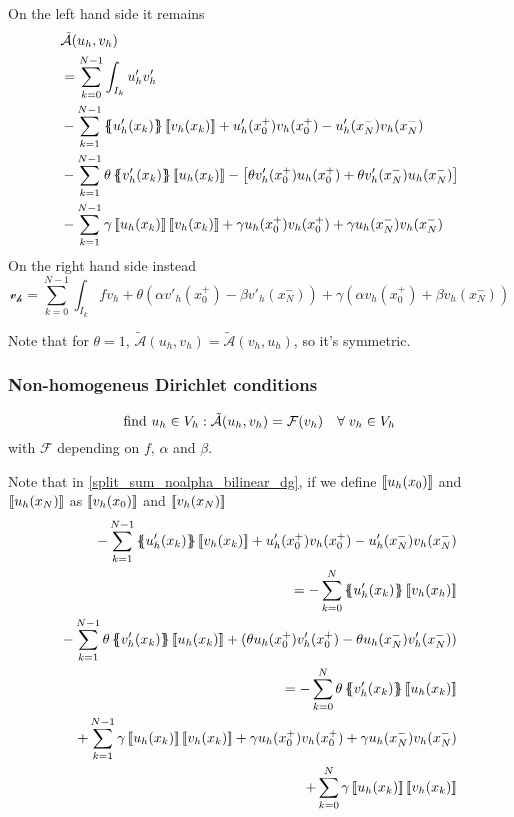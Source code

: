 On the left hand side it remains 
\begin{equation}
    \begin{split}
        & \tilde{\mathcal{A}} (u_h, v_h) \\
        & = \sum_{k=0}^{N-1} \int_{I_k} u'_hv'_h \\
        & - \sum_{k=1}^{N-1} \average{u'_h(x_k)}\jump{v_h(x_k)} + u'_h(x^+_0)v_h(x^+_0) - u'_h(x_N^-)v_h(x_N^-) \\
        & - \sum_{k=1}^{N-1} \theta \average{v'_h(x_k)} \jump{u_h(x_k)} - \left[\theta v'_h(x^+_0)u_h(x^+_0) + \theta v'_h(x^-_N)u_h(x^-_N)\right] \\
        & - \sum_{k=1}^{N-1} \gamma \jump{u_h(x_k)} \jump{v_h(x_k)} + \gamma u_h(x^+_0)v_h(x^+_0) + \gamma u_h(x_N^-)v_h(x_N^-) \label{split_sum_noalpha_bilinear_dg}
    \end{split}
\end{equation}
On the right hand side instead
\begin{equation}
    \mathcal{v_h} = \sum_{k=0}^{N-1} \int_{I_k} f v_h + \theta(\alpha v'_h(x^+_0) - \beta v'_h(x_N^-)) + \gamma(\alpha v_h(x^+_0) + \beta v_h(x^-_N))
\end{equation}
\begin{remark}
    Note that for \(\theta = 1\), \(\tilde{\mathcal{A}}(u_h, v_h) = \tilde{\mathcal{A}}(v_h, u_h)\), so it's symmetric.
\end{remark}
\subsubsection*{Non-homogeneus Dirichlet conditions}
\begin{equation}
    \text{find } u_h \in V_h : \tilde{\mathcal{A}}(u_h, v_h) = \mathcal{F}(v_h) \quad \forall \; v_h \in V_h
    \label{functional_dg}
\end{equation}
with \(\mathcal{F}\) depending on \(f\), \(\alpha\) and \(\beta\).

Note that in \eqref{split_sum_noalpha_bilinear_dg}, if we define \(\left[\!\left[u_h(x_0)\right]\!\right]\) and \(\left[\!\left[u_h(x_N)\right]\!\right]\) as \(\left[\!\left[v_h(x_0)\right]\!\right]\) and \(\left[\!\left[v_h(x_N)\right]\!\right]\)
\begin{equation*}
    \begin{split}
        -\sum_{k=1}^{N-1} \average{u'_h(x_k)} \jump{v_h(x_k)} + u'_h(x_0^+)v_h(x^+_0) - u'_h(x_N^-)v_h(x_N^-) \\
        = -\sum_{k=0}^{N} \average{u'_h(x_k)} \jump{v_h(x_h)} \\
         -\sum_{k=1}^{N-1} \theta \average{v'_h(x_k)} \jump{u_h(x_k)} + (\theta u_h(x_0^+)v'_h(x_0^+) - \theta u_h(x_N^-)v'_h(x_N^-)) \\
        = - \sum_{k=0}^{N} \theta \average{v'_h(x_k)}\jump{u_h(x_k)} \\
        + \sum_{k=1}^{N-1} \gamma \jump{u_h(x_k)} \jump{v_h(x_k)} + \gamma u_h(x_0^+)v_h(x_0^+) + \gamma u_h(x_N^-)v_h(x_N^-) \\
        + \sum_{k=0}^{N} \gamma \jump{u_h(x_k)}\jump{v_h(x_k)}
    \end{split}
\end{equation*}
